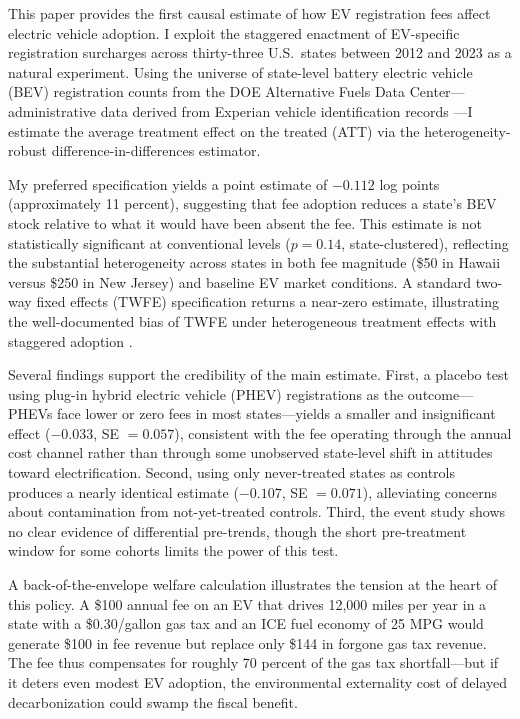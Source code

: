 \documentclass[12pt]{article}
\begin{document}
This paper provides the first causal estimate of how EV registration fees affect electric vehicle adoption. I exploit the staggered enactment of EV-specific registration surcharges across thirty-three U.S.\ states between 2012 and 2023 as a natural experiment. Using the universe of state-level battery electric vehicle (BEV) registration counts from the DOE Alternative Fuels Data Center---administrative data derived from Experian vehicle identification records \citep{afdc2024}---I estimate the average treatment effect on the treated (ATT) via the \citet{callaway2021difference} heterogeneity-robust difference-in-differences estimator.

My preferred specification yields a point estimate of $-0.112$ log points (approximately 11 percent), suggesting that fee adoption reduces a state's BEV stock relative to what it would have been absent the fee. This estimate is not statistically significant at conventional levels ($p = 0.14$, state-clustered), reflecting the substantial heterogeneity across states in both fee magnitude (\$50 in Hawaii versus \$250 in New Jersey) and baseline EV market conditions. A standard two-way fixed effects (TWFE) specification returns a near-zero estimate, illustrating the well-documented bias of TWFE under heterogeneous treatment effects with staggered adoption \citep{goodman2021difference, dechaisemartin2020two}.

Several findings support the credibility of the main estimate. First, a placebo test using plug-in hybrid electric vehicle (PHEV) registrations as the outcome---PHEVs face lower or zero fees in most states---yields a smaller and insignificant effect ($-0.033$, SE $= 0.057$), consistent with the fee operating through the annual cost channel rather than through some unobserved state-level shift in attitudes toward electrification. Second, using only never-treated states as controls produces a nearly identical estimate ($-0.107$, SE $= 0.071$), alleviating concerns about contamination from not-yet-treated controls. Third, the event study shows no clear evidence of differential pre-trends, though the short pre-treatment window for some cohorts limits the power of this test.

A back-of-the-envelope welfare calculation illustrates the tension at the heart of this policy. A \$100 annual fee on an EV that drives 12,000 miles per year in a state with a \$0.30/gallon gas tax and an ICE fuel economy of 25 MPG would generate \$100 in fee revenue but replace only \$144 in forgone gas tax revenue. The fee thus compensates for roughly 70 percent of the gas tax shortfall---but if it deters even modest EV adoption, the environmental externality cost of delayed decarbonization could swamp the fiscal benefit.
\end{document}
